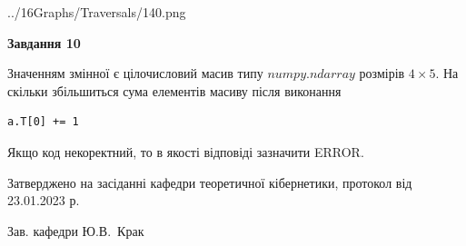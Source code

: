 \documentclass[12pt, ukrainian]{article}
\begin{document}
{\begin {large}
\begin{center}
	{../16Graphs/Traversals/140.png}
\end{center}\par
\newpage

{\begin {center}\textbf{Завдання 10}\end {center}}\par
Значенням змінної  є цілочисловий масив типу $numpy.ndarray$ розмірів $4{\times}5$. На скільки збільшиться сума елементів масиву  після виконання
\begin{verbatim}
a.T[0] += 1
\end{verbatim}


Якщо код некоректний, то в якості відповіді зазначити ERROR.\par
\newpage


\end {large}
}
{\smallskip \begin {small} Затверджено на засіданні кафедри теоретичної кібернетики, протокол  від   23.01.2023 р.\par\smallskip\smallskip
{\parbox {6.5 cm}{Зав. кафедри \dotfill Ю.В.~Крак}} \end{small}}
\end{document}

